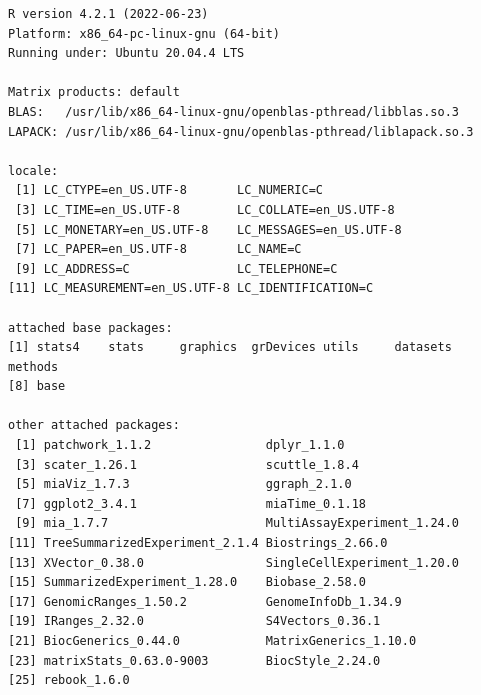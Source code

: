 \documentclass[
]{book}
\begin{document}
\begin{verbatim}
R version 4.2.1 (2022-06-23)
Platform: x86_64-pc-linux-gnu (64-bit)
Running under: Ubuntu 20.04.4 LTS

Matrix products: default
BLAS:   /usr/lib/x86_64-linux-gnu/openblas-pthread/libblas.so.3
LAPACK: /usr/lib/x86_64-linux-gnu/openblas-pthread/liblapack.so.3

locale:
 [1] LC_CTYPE=en_US.UTF-8       LC_NUMERIC=C              
 [3] LC_TIME=en_US.UTF-8        LC_COLLATE=en_US.UTF-8    
 [5] LC_MONETARY=en_US.UTF-8    LC_MESSAGES=en_US.UTF-8   
 [7] LC_PAPER=en_US.UTF-8       LC_NAME=C                 
 [9] LC_ADDRESS=C               LC_TELEPHONE=C            
[11] LC_MEASUREMENT=en_US.UTF-8 LC_IDENTIFICATION=C       

attached base packages:
[1] stats4    stats     graphics  grDevices utils     datasets  methods  
[8] base     

other attached packages:
 [1] patchwork_1.1.2                dplyr_1.1.0                   
 [3] scater_1.26.1                  scuttle_1.8.4                 
 [5] miaViz_1.7.3                   ggraph_2.1.0                  
 [7] ggplot2_3.4.1                  miaTime_0.1.18                
 [9] mia_1.7.7                      MultiAssayExperiment_1.24.0   
[11] TreeSummarizedExperiment_2.1.4 Biostrings_2.66.0             
[13] XVector_0.38.0                 SingleCellExperiment_1.20.0   
[15] SummarizedExperiment_1.28.0    Biobase_2.58.0                
[17] GenomicRanges_1.50.2           GenomeInfoDb_1.34.9           
[19] IRanges_2.32.0                 S4Vectors_0.36.1              
[21] BiocGenerics_0.44.0            MatrixGenerics_1.10.0         
[23] matrixStats_0.63.0-9003        BiocStyle_2.24.0              
[25] rebook_1.6.0                  


\end{verbatim}
\end{document}
